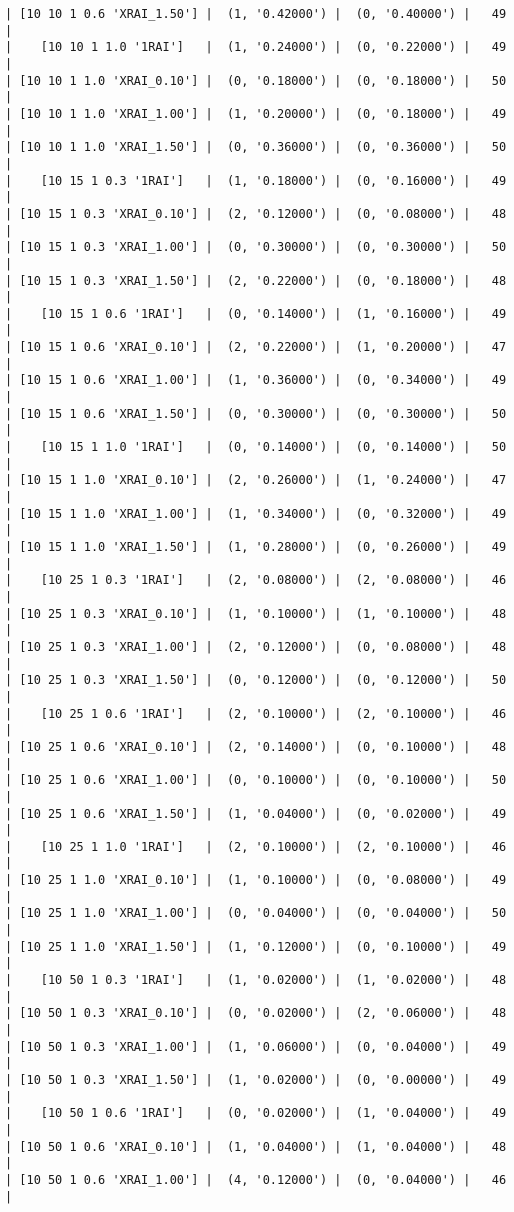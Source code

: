 \documentclass{article}
\begin{document}
\begin{verbatim}
| [10 10 1 0.6 'XRAI_1.50'] |  (1, '0.42000') |  (0, '0.40000') |   49  |
|    [10 10 1 1.0 '1RAI']   |  (1, '0.24000') |  (0, '0.22000') |   49  |
| [10 10 1 1.0 'XRAI_0.10'] |  (0, '0.18000') |  (0, '0.18000') |   50  |
| [10 10 1 1.0 'XRAI_1.00'] |  (1, '0.20000') |  (0, '0.18000') |   49  |
| [10 10 1 1.0 'XRAI_1.50'] |  (0, '0.36000') |  (0, '0.36000') |   50  |
|    [10 15 1 0.3 '1RAI']   |  (1, '0.18000') |  (0, '0.16000') |   49  |
| [10 15 1 0.3 'XRAI_0.10'] |  (2, '0.12000') |  (0, '0.08000') |   48  |
| [10 15 1 0.3 'XRAI_1.00'] |  (0, '0.30000') |  (0, '0.30000') |   50  |
| [10 15 1 0.3 'XRAI_1.50'] |  (2, '0.22000') |  (0, '0.18000') |   48  |
|    [10 15 1 0.6 '1RAI']   |  (0, '0.14000') |  (1, '0.16000') |   49  |
| [10 15 1 0.6 'XRAI_0.10'] |  (2, '0.22000') |  (1, '0.20000') |   47  |
| [10 15 1 0.6 'XRAI_1.00'] |  (1, '0.36000') |  (0, '0.34000') |   49  |
| [10 15 1 0.6 'XRAI_1.50'] |  (0, '0.30000') |  (0, '0.30000') |   50  |
|    [10 15 1 1.0 '1RAI']   |  (0, '0.14000') |  (0, '0.14000') |   50  |
| [10 15 1 1.0 'XRAI_0.10'] |  (2, '0.26000') |  (1, '0.24000') |   47  |
| [10 15 1 1.0 'XRAI_1.00'] |  (1, '0.34000') |  (0, '0.32000') |   49  |
| [10 15 1 1.0 'XRAI_1.50'] |  (1, '0.28000') |  (0, '0.26000') |   49  |
|    [10 25 1 0.3 '1RAI']   |  (2, '0.08000') |  (2, '0.08000') |   46  |
| [10 25 1 0.3 'XRAI_0.10'] |  (1, '0.10000') |  (1, '0.10000') |   48  |
| [10 25 1 0.3 'XRAI_1.00'] |  (2, '0.12000') |  (0, '0.08000') |   48  |
| [10 25 1 0.3 'XRAI_1.50'] |  (0, '0.12000') |  (0, '0.12000') |   50  |
|    [10 25 1 0.6 '1RAI']   |  (2, '0.10000') |  (2, '0.10000') |   46  |
| [10 25 1 0.6 'XRAI_0.10'] |  (2, '0.14000') |  (0, '0.10000') |   48  |
| [10 25 1 0.6 'XRAI_1.00'] |  (0, '0.10000') |  (0, '0.10000') |   50  |
| [10 25 1 0.6 'XRAI_1.50'] |  (1, '0.04000') |  (0, '0.02000') |   49  |
|    [10 25 1 1.0 '1RAI']   |  (2, '0.10000') |  (2, '0.10000') |   46  |
| [10 25 1 1.0 'XRAI_0.10'] |  (1, '0.10000') |  (0, '0.08000') |   49  |
| [10 25 1 1.0 'XRAI_1.00'] |  (0, '0.04000') |  (0, '0.04000') |   50  |
| [10 25 1 1.0 'XRAI_1.50'] |  (1, '0.12000') |  (0, '0.10000') |   49  |
|    [10 50 1 0.3 '1RAI']   |  (1, '0.02000') |  (1, '0.02000') |   48  |
| [10 50 1 0.3 'XRAI_0.10'] |  (0, '0.02000') |  (2, '0.06000') |   48  |
| [10 50 1 0.3 'XRAI_1.00'] |  (1, '0.06000') |  (0, '0.04000') |   49  |
| [10 50 1 0.3 'XRAI_1.50'] |  (1, '0.02000') |  (0, '0.00000') |   49  |
|    [10 50 1 0.6 '1RAI']   |  (0, '0.02000') |  (1, '0.04000') |   49  |
| [10 50 1 0.6 'XRAI_0.10'] |  (1, '0.04000') |  (1, '0.04000') |   48  |
| [10 50 1 0.6 'XRAI_1.00'] |  (4, '0.12000') |  (0, '0.04000') |   46  |

\end{verbatim}
\end{document}

